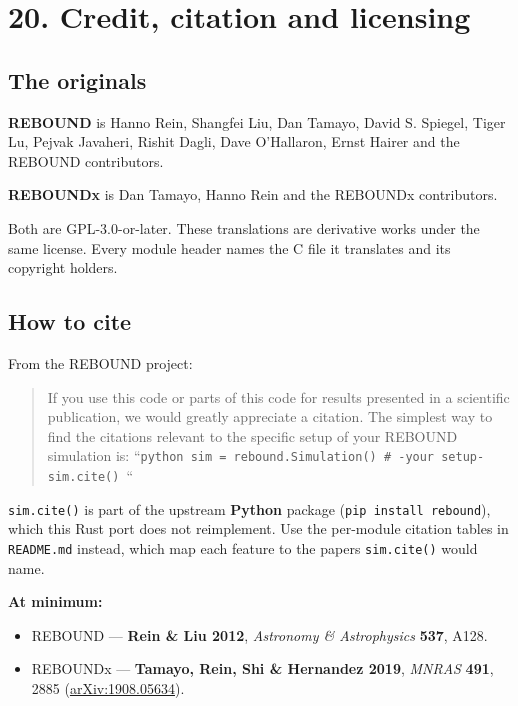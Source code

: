 \documentclass[11pt]{article}
\begin{document}
\section{20. Credit, citation and licensing}

\subsection{The originals}

\textbf{REBOUND} is \textcopyright{} Hanno Rein, Shangfei Liu, Dan Tamayo, David S. Spiegel, Tiger Lu, Pejvak Javaheri, Rishit Dagli, Dave O'Hallaron, Ernst Hairer and the REBOUND contributors.

\textbf{REBOUNDx} is \textcopyright{} Dan Tamayo, Hanno Rein and the REBOUNDx contributors.

Both are GPL-3.0-or-later. These translations are derivative works under the same license. Every module header names the C file it translates and its copyright holders.

\subsection{How to cite}

From the REBOUND project:

\begin{quote}
If you use this code or parts of this code for results presented in a scientific publication, we would greatly appreciate a citation. The simplest way to find the citations relevant to the specific setup of your REBOUND simulation is:  ``\texttt{python sim = rebound.Simulation() \# -your setup- sim.cite() }``
\end{quote}

\texttt{sim.cite()} is part of the upstream \textbf{Python} package (\texttt{pip install rebound}), which this Rust port does not reimplement. Use the per-module citation tables in \texttt{README.md} instead, which map each feature to the papers \texttt{sim.cite()} would name.

\textbf{At minimum:}

\begin{itemize}
\item REBOUND --- \textbf{Rein \& Liu 2012}, \emph{Astronomy \& Astrophysics} \textbf{537}, A128.
\item REBOUNDx --- \textbf{Tamayo, Rein, Shi \& Hernandez 2019}, \emph{MNRAS} \textbf{491}, 2885 (\href{https://arxiv.org/abs/1908.05634}{arXiv:1908.05634}).
\end{itemize}
\end{document}
